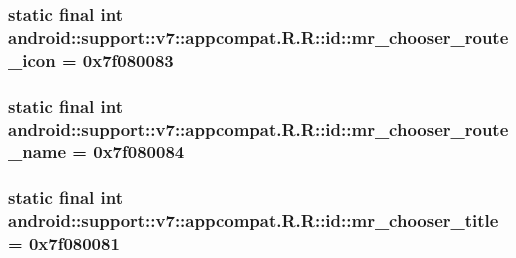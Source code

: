 \hypertarget{classandroid_1_1support_1_1v7_1_1appcompat_1_1_r_1_1id_99277d74c10abd8a76e7174d5f4bbf84}{
\subsubsection[{mr\_\-chooser\_\-route\_\-icon}]{\setlength{\rightskip}{0pt plus 5cm}static final int android::support::v7::appcompat.R.R::id::mr\_\-chooser\_\-route\_\-icon = 0x7f080083}}
\label{classandroid_1_1support_1_1v7_1_1appcompat_1_1_r_1_1id_99277d74c10abd8a76e7174d5f4bbf84}


\hypertarget{classandroid_1_1support_1_1v7_1_1appcompat_1_1_r_1_1id_668b45e59d722f0f352198c7a66f70ad}{
\subsubsection[{mr\_\-chooser\_\-route\_\-name}]{\setlength{\rightskip}{0pt plus 5cm}static final int android::support::v7::appcompat.R.R::id::mr\_\-chooser\_\-route\_\-name = 0x7f080084}}
\label{classandroid_1_1support_1_1v7_1_1appcompat_1_1_r_1_1id_668b45e59d722f0f352198c7a66f70ad}


\hypertarget{classandroid_1_1support_1_1v7_1_1appcompat_1_1_r_1_1id_f58b05e107002401c9e0001d6dec55fe}{
\subsubsection[{mr\_\-chooser\_\-title}]{\setlength{\rightskip}{0pt plus 5cm}static final int android::support::v7::appcompat.R.R::id::mr\_\-chooser\_\-title = 0x7f080081}}
\label{classandroid_1_1support_1_1v7_1_1appcompat_1_1_r_1_1id_f58b05e107002401c9e0001d6dec55fe}


